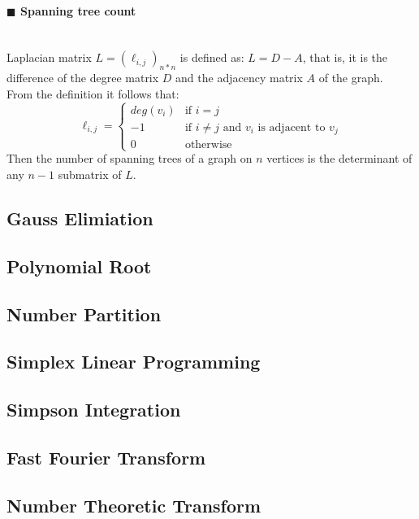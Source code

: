 \documentclass[10pt]{article}
\begin{document}
\paragraph{$\blacksquare$ Spanning tree count}
\noindent \\
Laplacian matrix $L=(\ell_{i,j})_{n*n}$ is defined as: $L=D-A$, that is, it is the difference of the degree matrix $D$ and the adjacency matrix $A$ of the graph. \\
From the definition it follows that:
\begin{displaymath}
  \ell_{i,j}=
  \left\{ \begin{array}{ll}
    deg(v_i) & \textrm{if } i=j \\
    -1 & \textrm{if }i\ne j\textrm{ and }v_i\textrm{ is adjacent to }v_j \\
    0 & \textrm{otherwise}
  \end{array} \right.
\end{displaymath}
Then the number of spanning trees of a graph on $n$ vertices is the determinant of any $n-1$ submatrix of $L$.
\subsection{Gauss Elimiation}

\subsection{Polynomial Root}

\subsection{Number Partition}

\subsection{Simplex Linear Programming}

\subsection{Simpson Integration}

\subsection{Fast Fourier Transform}

\subsection{Number Theoretic Transform}

\end{document}
